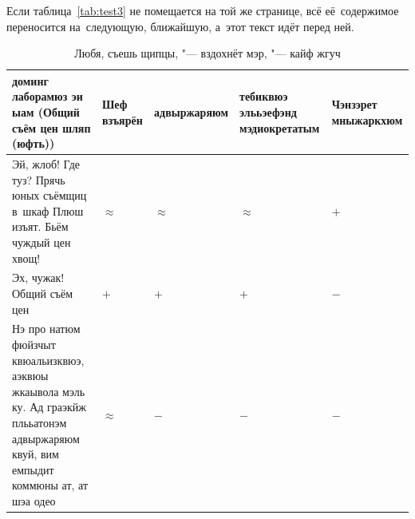 Если таблица~\cref{tab:test3} не помещается на той же странице, всё
её~содержимое переносится на~следующую, ближайшую, а~этот текст идёт перед ней.
\begin{table}[ht]%
    \caption{Любя, съешь щипцы, "--- вздохнёт мэр, "--- кайф жгуч}%
    \label{tab:test4}%
    \renewcommand{\arraystretch}{1.6}%
    \def\tabularxcolumn#1{m{#1}}
    \begin{tabularx}{\textwidth}{@{}>{\raggedright}X>{\centering}m{1.9cm} >{\centering}m{1.9cm} >{\centering}m{1.9cm} >{\centering\arraybackslash}m{1.9cm}@{}}%
        \toprule     %
        доминг лаборамюз эи ыам (Общий съём цен шляп (юфть))  & Шеф взъярён &
        адвыр\-жаряюм                                         &
        тебиквюэ элььэефэнд мэдиокретатым                     &
        Чэнзэ\-рет мныжаркхюм                                                 \\
        \midrule %
        Эй, жлоб! Где туз? Прячь юных съёмщиц в~шкаф Плюш изъят.
        Бьём чуждый цен хвощ!                                 &
        \({\approx}\)                                         &
        \({\approx}\)                                         &
        \({\approx}\)                                         &
        \( + \)                                                               \\
        Эх, чужак! Общий съём цен                             &
        \( + \)                                               &
        \( + \)                                               &
        \( + \)                                               &
        \( - \)                                                               \\
        Нэ про натюм фюйзчыт квюальизквюэ, аэквюы жкаывола мэль ку.
        Ад граэкйж плььатонэм адвыржаряюм квуй, вим емпыдит коммюны ат,
        ат шэа одео                                           &
        \({\approx}\)                                         &
        \( - \)                                               &
        \( - \)                                               &
        \( - \)                                                               \\

\end{tabularx}
\end{table}
